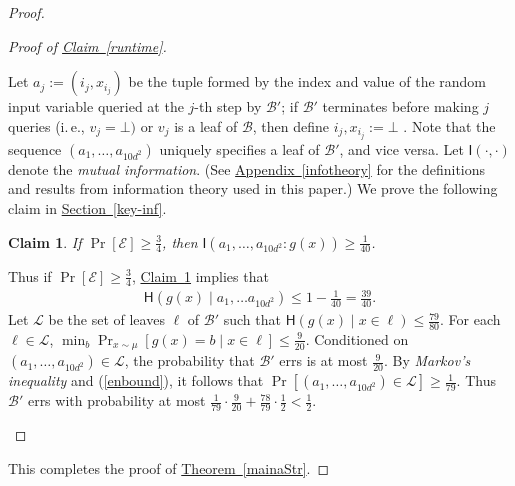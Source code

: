 \documentclass[11pt]{article}
\numberwithin{equation}{section}
\newtheorem{claim}[theorem]{Claim}
\theoremstyle{definition}
\theoremstyle{plain}
\newcommand{\ie}{i.\,e.}
\newcommand{\expref}[2]{\hyperref[#2]{#1~\ref{#2}}}
\newcommand{\clB}{\mathcal{B}}
\newcommand{\clE}{\mathcal{E}}
\newcommand{\clL}{\mathcal{L}}
\newcommand{\I}{\mathsf{I}}
\newcommand{\Hen}{\mathsf{H}}
\begin{document}
\begin{proof}
\begin{proof}[Proof of {\expref{Claim}{runtime}}]
\begin{description}
  Let $a_j:=(i_j, x_{i_j})$ be the tuple formed by the index and value of the random input variable queried at the $j$-th step by $\clB'$; if $\clB'$ terminates before making $j$ queries (\ie, $v_j = \bot)$ or $v_j$ is a leaf of $\clB$, then define $i_j, x_{i_j}:=\bot$ . Note that the sequence $(a_1, \ldots, a_{10d^2})$ uniquely specifies a leaf of $\clB'$, and vice versa. Let $\I(\cdot, \cdot)$ denote the \emph{mutual information}. (See \expref{Appendix}{infotheory} for the definitions and results from information theory used in this %
paper.)
We prove the following claim in \expref{Section}{key-inf}.
\begin{claim}
\label{keyinf}
If $\Pr[\clE] \geq \frac{3}{4}$, then $\I(a_1, \ldots, a_{10d^2}:g(x)) \geq \frac{1}{40}$.
\end{claim}
Thus if $\Pr[\clE] \geq \frac{3}{4}$, \expref{Claim}{keyinf} implies that
\begin{align}
\Hen(g(x) \mid a_1, \ldots a_{10d^2}) \leq 1-\frac{1}{40}=\frac{39}{40}. \label{enbound}
\end{align}
Let $\clL$ be the set of leaves $\ell$ of $\clB'$ such that $\Hen(g(x) \mid x \in \ell) \leq \frac{79}{80}$. For each $\ell \in \clL$, $\min_b \Pr_{x \sim \mu}[g(x)=b \mid x \in \ell] \leq \frac{9}{20}$. Conditioned on $(a_1, \ldots, a_{10d^2}) \in \clL$, the probability that $\clB'$ errs is at most $\frac{9}{20}$. By \emph{Markov's inequality} and (\ref{enbound}), it follows that $\Pr[(a_1, \ldots, a_{10d^2}) \in \clL] \geq \frac{1}{79}$. Thus $\clB'$ errs with probability at most $\frac{1}{79}\cdot \frac{9}{20}+\frac{78}{79}\cdot \frac{1}{2}<\frac{1}{2}$.
\end{description}
\end{proof}
This completes the proof of \expref{Theorem}{mainaStr}.
\end{proof}
\end{document}
